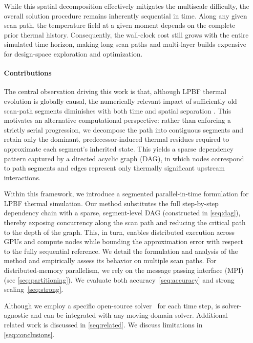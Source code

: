 \documentclass[conference]{IEEEtran}
\begin{document}
While this spatial decomposition effectively mitigates the multiscale difficulty, the overall solution procedure remains inherently sequential in time. Along any given scan path, the temperature field at a given moment depends on the complete prior thermal history. Consequently, the wall-clock cost still grows with the entire simulated time horizon, making long scan paths and multi-layer builds expensive for design-space exploration and optimization.

\paragraph{Contributions}
The central observation driving this work is that, although LPBF thermal evolution is globally causal, the numerically relevant impact of sufficiently old scan-path segments diminishes with both time and spatial separation \cite{aydin2026hermes, yeung2020residual}. This motivates an alternative computational perspective: rather than enforcing a strictly serial progression, we decompose the path into contiguous segments and retain only the dominant, predecessor-induced thermal residues required to approximate each segment’s inherited state. This yields a sparse dependency pattern captured by a directed acyclic graph (DAG), in which nodes correspond to path segments and edges represent only thermally significant upstream interactions.

Within this framework, we introduce a segmented parallel-in-time formulation for LPBF thermal simulation. Our method substitutes the full step-by-step dependency chain with a sparse, segment-level DAG (constructed in \cref{seq:dag}), thereby exposing concurrency along the scan path and reducing the critical path to the depth of the graph. This, in turn, enables distributed execution across GPUs and compute nodes while bounding the approximation error with respect to the fully sequential reference. We detail the formulation and analysis of the method and empirically assess its behavior on multiple scan paths. For distributed-memory parallelism, we rely on the message passing interface (MPI) (see \cref{seq:partitioning}). We evaluate both accuracy~\cref{seq:accuracy} and strong scaling~\cref{seq:strong}. 

Although we employ a specific open-source solver~\cite{aydin2026hermes} for each time step, \method is solver-agnostic and can be integrated with any moving-domain solver. Additional related work is discussed in \cref{seq:related}. We discuss  limitations in \cref{seq:conclusions}.
\end{document}

